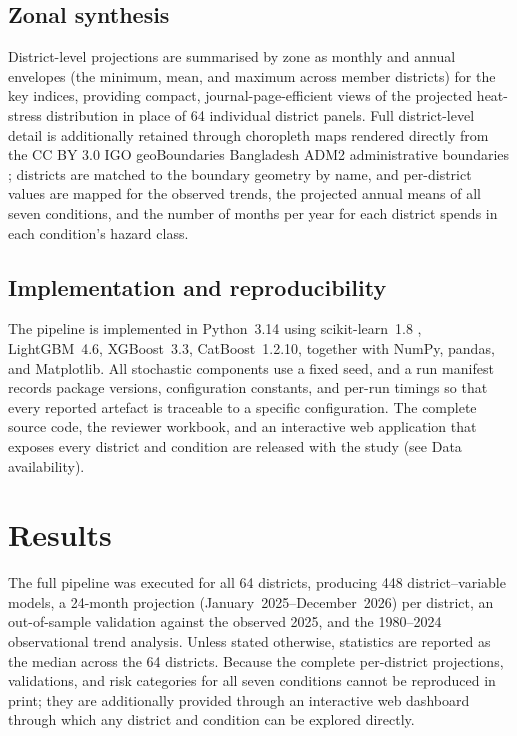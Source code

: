 \documentclass[pdflatex,sn-basic,lineno]{sn-jnl}
\begin{document}
\subsection{Zonal synthesis}\label{sec:zonal}
District-level projections are summarised by zone as monthly and annual
envelopes (the minimum, mean, and maximum across member districts) for the key
indices, providing compact, journal-page-efficient views of the projected
heat-stress distribution in place of 64 individual district panels. Full
district-level detail is additionally retained through choropleth maps rendered
directly from the CC BY 3.0 IGO geoBoundaries Bangladesh ADM2 administrative
boundaries \citep{GeoBoundaries2020}; districts are matched to the boundary geometry
by name, and per-district values are mapped for the observed trends, the projected
annual means of all seven conditions, and the number of months per year for each
district spends in each condition's hazard class.

\subsection{Implementation and reproducibility}\label{sec:impl}
The pipeline is implemented in Python~3.14 using scikit-learn~1.8
\citep{Pedregosa2011}, LightGBM~4.6, XGBoost~3.3, CatBoost~1.2.10, together with
NumPy, pandas, and Matplotlib. All stochastic components use a fixed seed, and a
run manifest records package versions, configuration constants, and per-run
timings so that every reported artefact is traceable to a specific
configuration. The complete source code, the reviewer workbook, and an
interactive web application that exposes every district and condition are
released with the study (see Data availability).


\section{Results}\label{sec:results}

The full pipeline was executed for all 64 districts, producing 448
district--variable models, a 24-month projection (January~2025--December~2026)
per district, an out-of-sample validation against the observed 2025, and the
1980--2024 observational trend analysis. Unless stated otherwise, statistics are
reported as the median across the 64 districts. Because the complete per-district
projections, validations, and risk categories for all seven conditions cannot be
reproduced in print; they are additionally provided through an interactive web
dashboard%
through which any district and condition can be explored directly.
\end{document}
